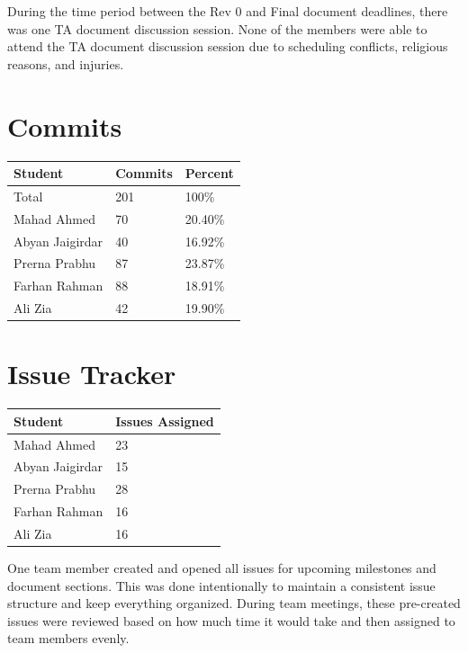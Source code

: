 \documentclass{article}
\begin{document}
\noindent During the time period between the Rev 0 and Final document deadlines, there was one TA document discussion session. None of the members were able to attend the TA document discussion session due to scheduling conflicts, religious reasons, and injuries.

\section{Commits}

\begin{table}[H]
\centering
\begin{tabular}{lll}
\toprule
\textbf{Student} & \textbf{Commits} & \textbf{Percent}\\
\midrule
Total & 201 & 100\% \\
Mahad Ahmed & 70 & 20.40\% \\
Abyan Jaigirdar & 40 & 16.92\% \\
Prerna Prabhu & 87 & 23.87\% \\
Farhan Rahman & 88 & 18.91\% \\
Ali Zia & 42 & 19.90\% \\
\bottomrule
\end{tabular}
\end{table}

\section{Issue Tracker}

\begin{table}[H]
\centering
\begin{tabular}{ll}
\toprule
\textbf{Student}  & \textbf{Issues Assigned}\\
\midrule
Mahad Ahmed  & 23 \\
Abyan Jaigirdar  & 15 \\
Prerna Prabhu  & 28 \\
Farhan Rahman  & 16 \\
Ali Zia & 16 \\
\bottomrule
\end{tabular}
\end{table}

\noindent
One team member created and opened all issues for upcoming milestones and document sections. This was done intentionally to maintain a consistent issue structure and keep everything organized. During team meetings, these pre-created issues were reviewed based on how much time it would take and then assigned to team members evenly. \\
\end{document}
